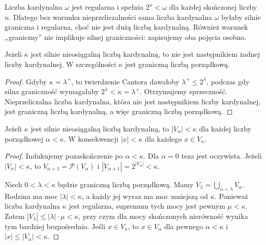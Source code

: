 \begin{uwaga}
\label{rem:lc37-omega}
Liczba kardynalna $\omega$ jest regularna i spełnia
$2^n<\omega$ dla każdej skończonej liczby $n$.
Dlatego bez warunku nieprzeliczalności sama liczba kardynalna $\omega$
byłaby silnie graniczna i regularna, choć nie
jest dużą liczbą kardynalną. Również warunek „graniczny”
nie implikuje silnej graniczności:
zapisujemy oba pojęcia osobno.
\end{uwaga}

\begin{lemat}
\label{lem:lc37-limit}
Jeżeli $\kappa$ jest silnie nieosiągalną liczbą kardynalną,
to nie jest następnikiem żadnej liczby kardynalnej.
W szczególności $\kappa$ jest graniczną liczbą porządkową.
\end{lemat}
\begin{proof}
Gdyby $\kappa=\lambda^+$, to twierdzenie Cantora
dawałoby $\lambda^+\le 2^\lambda$, podczas gdy
silna graniczność wymagałaby $2^\lambda<\kappa=\lambda^+$.
Otrzymujemy sprzeczność.
Nieprzeliczalna liczba kardynalna, która nie jest następnikiem
liczby kardynalnej, jest graniczną liczbą kardynalną, a więc
graniczną liczbą porządkową.
\end{proof}

\begin{lemat}
\label{lem:lc37-small-ranks}
Jeżeli $\kappa$ jest silnie nieosiągalną liczbą kardynalną,
to $|V_\alpha|<\kappa$ dla każdej liczby porządkowej
$\alpha<\kappa$.
W konsekwencji $|x|<\kappa$ dla każdego $x\in V_\kappa$.
\end{lemat}
\begin{proof}
Indukujemy pozaskończenie po $\alpha<\kappa$.
Dla $\alpha=0$ teza jest oczywista.
Jeżeli $|V_\alpha|<\kappa$, to
$V_{\alpha+1}=\mathcal P(V_\alpha)$ i
$|V_{\alpha+1}|=2^{|V_\alpha|}<\kappa$.

Niech $0<\lambda<\kappa$ będzie graniczną liczbą
porządkową. Mamy
$V_\lambda=\bigcup_{\alpha<\lambda}V_\alpha$.
Rodzina ma moc $|\lambda|<\kappa$, a każdy
jej wyraz ma moc mniejszą od $\kappa$.
Ponieważ liczba kardynalna $\kappa$ jest regularna, supremum
tych mocy jest pewnym $\mu<\kappa$.
Zatem
$|V_\lambda|\le|\lambda|\cdot\mu<\kappa$,
przy czym dla mocy skończonych nierówność
wynika tym bardziej bezpośrednio.
Jeśli $x\in V_\kappa$, to $x\in V_\alpha$
dla pewnego $\alpha<\kappa$ i
$|x|\le|V_\alpha|<\kappa$.
\end{proof}

